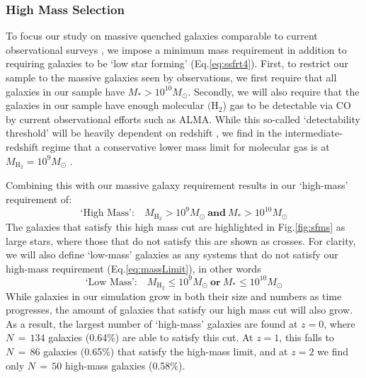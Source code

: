 \documentclass[twocolumn, linenumbers]{aastex631}
\newcommand{\hh}{\text{H}_2}
\newcommand{\mhh}{M_{\text{H}_2}}
\newcommand{\eq}{Eq.\hspace{.2em}}
\renewcommand{\fig}{Fig.\hspace{.2em}}
\begin{document}
\subsubsection{High Mass Selection}
\label{ssec:massLimit}
To focus our study on massive quenched galaxies comparable to current observational surveys \citep[e.g.][]{rowlands, french_2015, french_2017, French_2018, suessSquiggle, Bezanson_2022, Baron2023, french23, Spilker2025}, we impose a minimum mass requirement in addition to requiring galaxies to be `low star forming' (\eq \ref{eq:ssfrt4}).  First, to restrict our sample to the massive galaxies seen by observations, we first require that all galaxies in our sample have $M_*>10^{10}M_\odot$.  Secondly, we will also require that the galaxies in our sample have enough molecular $(\hh$) gas to be detectable via CO by current observational efforts such as ALMA.  While this so-called `detectability threshold' will be heavily dependent on redshift \citep{Bezanson_2022, Baron2023}, we find in the intermediate-redshift regime that a conservative lower mass limit for molecular gas is at $\mhh=10^9M_\odot$ \citep{suess_2017, suessSquiggle}.  

Combining this with our massive galaxy requirement results in our `high-mass' requirement of:
\begin{equation}
    \text{`High Mass':}\quad \mhh>10^9M_\odot\ \textbf{and}\ M_*>10^{10}M_\odot
    \label{eq:massLimit}
\end{equation}
The galaxies that satisfy this high mass cut are highlighted in \fig \ref{fig:sfms} as large stars, where those that do not satisfy this are shown as crosses.  For clarity, we will also define `low-mass' galaxies as any systems that do not satisfy our high-mass requirement (\eq \ref{eq:massLimit}), in other words
\begin{equation}
    \text{`Low Mass':}\quad \mhh\leq 10^9M_\odot\ \textbf{or}\ M_*
    \leq 10^{10}M_\odot
    \label{eq:massLowLim}
\end{equation}
While galaxies in our simulation grow in both their size and numbers as time progresses, the amount of galaxies that satisfy our high mass cut will also grow.  As a result, the largest number of `high-mass' galaxies are found at $z=0$, where $N\,\mathbin{=}\,134$ galaxies (0.64\%) are able to satisfy this cut.  At $z=1$, this falls to $N\,\mathbin{=}\,86$ galaxies (0.65\%) that satisfy the high-mass limit, and at $z=2$ we find only $N\,\mathbin{=}\,50$ high-mass galaxies (0.58\%).
\end{document}
